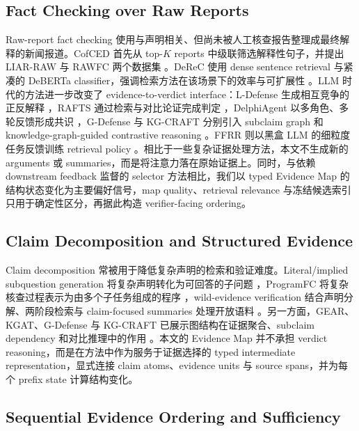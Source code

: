 \documentclass[letterpaper]{article}
\begin{document}
\subsection{Fact Checking over Raw Reports}

Raw-report fact checking 使用与声明相关、但尚未被人工核查报告整理成最终解释的新闻报道。CofCED 首先从 top-$K$ reports 中级联筛选解释性句子，并提出 LIAR-RAW 与 RAWFC 两个数据集 \citep{Yang2022CofCED}。DeReC 使用 dense sentence retrieval 与紧凑的 DeBERTa classifier，强调检索方法在该场景下的效率与可扩展性 \citep{Qazi2025DeReC}。LLM 时代的方法进一步改变了 evidence-to-verdict interface：L-Defense 生成相互竞争的正反解释 \citep{Wang2024LDefense}，RAFTS 通过检索与对比论证完成判定 \citep{Yue2024RAFTS}，DelphiAgent 以多角色、多轮反馈形成共识 \citep{Xiong2025DelphiAgent}，G-Defense 与 KG-CRAFT 分别引入 subclaim graph 和 knowledge-graph-guided contrastive reasoning \citep{Wang2026GDefense,Lourenco2026KGCRAFT}。FFRR 则以黑盒 LLM 的细粒度任务反馈训练 retrieval policy \citep{Zhang2024FFRR}。相比于一些复杂证据处理方法，本文不生成新的 arguments 或 summaries，而是将注意力落在原始证据上。同时，与依赖 downstream feedback 监督的 selector 方法相比，我们以 typed Evidence Map 的结构状态变化为主要偏好信号，map quality、retrieval relevance 与冻结候选索引只用于确定性区分，再据此构造 verifier-facing ordering。

\subsection{Claim Decomposition and Structured Evidence}

Claim decomposition 常被用于降低复杂声明的检索和验证难度。Literal/implied subquestion generation 将复杂声明转化为可回答的子问题 \citep{Chen2022ClaimDecomp}，ProgramFC 将复杂核查过程表示为由多个子任务组成的程序 \citep{Pan2023ProgramFC}，wild-evidence verification 结合声明分解、两阶段检索与 claim-focused summaries 处理开放语料 \citep{Chen2023WildEvidence}。另一方面，GEAR、KGAT、G-Defense 与 KG-CRAFT 已展示图结构在证据聚合、subclaim dependency 和对比推理中的作用 \citep{Zhou2019GEAR,Liu2019KGAT,Wang2026GDefense,Lourenco2026KGCRAFT}。本文的 Evidence Map 并不承担 verdict reasoning，而是在方法中作为服务于证据选择的 typed intermediate representation，显式连接 claim atoms、evidence units 与 source spans，并为每个 prefix state 计算结构变化。

\subsection{Sequential Evidence Ordering and Sufficiency}
\end{document}
